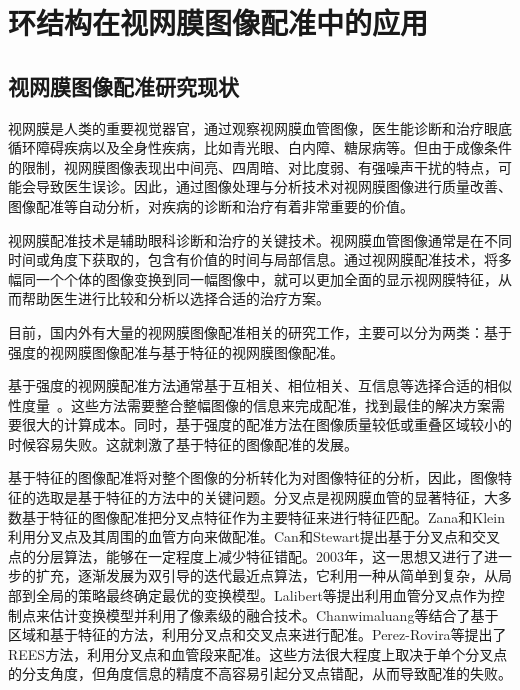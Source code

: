 

\chapter{环结构在视网膜图像配准中的应用}

\renewcommand\arraystretch{1}

\section{视网膜图像配准研究现状}
\label{cha:retinal}

视网膜是人类的重要视觉器官，通过观察视网膜血管图像，医生能诊断和治疗眼底循环障碍疾病以及全身性疾病，比如青光眼、白内障、糖尿病等。但由于成像条件的限制，视网膜图像表现出中间亮、四周暗、对比度弱、有强噪声干扰的特点，可能会导致医生误诊。因此，通过图像处理与分析技术对视网膜图像进行质量改善、图像配准等自动分析，对疾病的诊断和治疗有着非常重要的价值。

视网膜配准技术是辅助眼科诊断和治疗的关键技术。视网膜血管图像通常是在不同时间或角度下获取的，包含有价值的时间与局部信息。通过视网膜配准技术，将多幅同一个个体的图像变换到同一幅图像中，就可以更加全面的显示视网膜特征，从而帮助医生进行比较和分析以选择合适的治疗方案。

目前，国内外有大量的视网膜图像配准相关的研究工作，主要可以分为两类：基于强度的视网膜图像配准与基于特征的视网膜图像配准\cite{oliveira2014medical}。

基于强度的视网膜配准方法通常基于互相关、相位相关、互信息\cite{penney1998comparison}等选择合适的相似性度量~\cite{Glocker02,Nunes03,Dreo04}。这些方法需要整合整幅图像的信息来完成配准，找到最佳的解决方案需要很大的计算成本。同时，基于强度的配准方法在图像质量较低或重叠区域较小的时候容易失败。这就刺激了基于特征的图像配准的发展。

基于特征的图像配准将对整个图像的分析转化为对图像特征的分析\cite{dingnan}，因此，图像特征的选取是基于特征的方法中的关键问题。分叉点是视网膜血管的显著特征，大多数基于特征的图像配准把分叉点特征作为主要特征来进行特征匹配。Zana和Klein\cite{zana1999multimodal}利用分叉点及其周围的血管方向来做配准。Can和Stewart\cite{can2002feature}提出基于分叉点和交叉点的分层算法，能够在一定程度上减少特征错配。2003年，这一思想又进行了进一步的扩充，逐渐发展为双引导的迭代最近点算法\cite{stewart2003dual}，它利用一种从简单到复杂，从局部到全局的策略最终确定最优的变换模型。Lalibert\cite{laliberte2003registration}等提出利用血管分叉点作为控制点来估计变换模型并利用了像素级的融合技术。Chanwimaluang\cite{chanwimaluang2006hybrid}等结合了基于区域和基于特征的方法，利用分叉点和交叉点来进行配准。Perez-Rovira\cite{perez2012rerbee}等提出了REES方法，利用分叉点和血管段来配准。这些方法很大程度上取决于单个分叉点的分支角度，但角度信息的精度不高容易引起分叉点错配，从而导致配准的失败。

